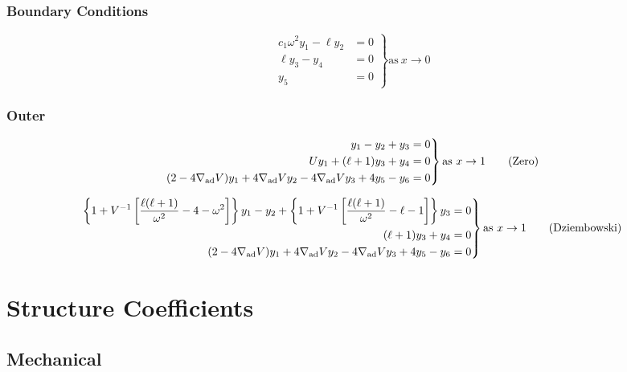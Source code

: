 \documentclass[fleqn]{article}
\newcommand{\nabad}{\ensuremath{\nabla_{\rm ad}}}
\begin{document}
\subsubsection*{Boundary Conditions}

\begin{equation*}
\left.
\begin{aligned}
c_{1} \omega^{2} y_{1} - \ell y_{2} &= 0 \\
\ell y_{3} - y_{4} &= 0 \\
y_{5} &= 0
\end{aligned}
\right\}
\text{as}\ x \rightarrow 0
\end{equation*}

\subsubsection*{Outer}

\begin{equation*}
\left.
\begin{aligned}
y_{1} - y_{2} + y_{3} &= 0 \\
U y_{1} + (\ell + 1) y_{3} + y_{4} &= 0 \\
(2 - 4\nabad V) y_{1} + 4 \nabad V y_{2} - 4 \nabad V y_{3} + 4 y_{5} - y_{6} &= 0
\end{aligned}
\right\}
\text{as}\ x \rightarrow 1 \qquad \text{(Zero)}
\end{equation*}

\begin{equation*}
\left.
\begin{aligned}
\left\{ 1 + V^{-1} \left[ \frac{\ell(\ell+1)}{\omega^{2}} - 4 - \omega^{2} \right] \right\} y_{1} -
y_{2} +
\left\{ 1 + V^{-1} \left[ \frac{\ell(\ell+1)}{\omega^{2}} - \ell - 1 \right] \right\} y_{3} &= 0 \\
(\ell + 1) y_{3} + y_{4} &= 0 \\
(2 - 4\nabad V) y_{1} + 4 \nabad V y_{2} - 4 \nabad V y_{3} + 4 y_{5} - y_{6} &= 0
\end{aligned}
\right\}
\text{as}\ x \rightarrow 1 \qquad \text{(Dziembowski)}
\end{equation*}


\newpage

\section*{Structure Coefficients}

\subsection*{Mechanical}
\end{document}

